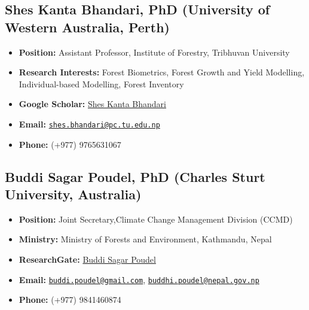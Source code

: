 \documentclass[
]{article}
\providecommand{\tightlist}{%
  \setlength{\itemsep}{0pt}\setlength{\parskip}{0pt}}
\begin{document}
\subsection{Shes Kanta Bhandari, PhD (University of Western Australia,
Perth)}\label{shes-kanta-bhandari-phd-university-of-western-australia-perth}

\begin{itemize}
\tightlist
\item
  \textbf{Position:} Assistant Professor, Institute of Forestry,
  Tribhuvan University
\item
  \textbf{Research Interests:} Forest Biometrics, Forest Growth and
  Yield Modelling, Individual-based Modelling, Forest Inventory
\item
  \textbf{Google Scholar:}
  \href{https://scholar.google.com/citations?user=k9sUEZkAAAAJ}{Shes
  Kanta Bhandari}
\item
  \textbf{Email:}
  \href{mailto:shes.bhandari@pc.tu.edu.np}{\nolinkurl{shes.bhandari@pc.tu.edu.np}}
\item
  \textbf{Phone:} (+977) 9765631067
\end{itemize}

\subsection{Buddi Sagar Poudel, PhD (Charles Sturt University,
Australia)}\label{buddi-sagar-poudel-phd-charles-sturt-university-australia}

\begin{itemize}
\tightlist
\item
  \textbf{Position:} Joint Secretary,Climate Change Management Division
  (CCMD)
\item
  \textbf{Ministry:} Ministry of Forests and Environment, Kathmandu,
  Nepal
\item
  \textbf{ResearchGate:}
  \href{https://www.researchgate.net/profile/Buddi-Poudel}{Buddi Sagar
  Poudel}
\item
  \textbf{Email:}
  \href{mailto:buddi.poudel@gmail.com}{\nolinkurl{buddi.poudel@gmail.com}},
  \href{mailto:buddhi.poudel@nepal.gov.np}{\nolinkurl{buddhi.poudel@nepal.gov.np}}
\item
  \textbf{Phone:} (+977) 9841460874
\end{itemize}
\end{document}

